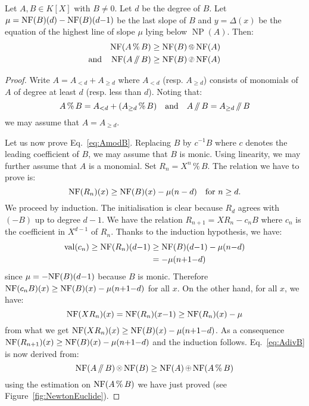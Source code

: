 \documentclass{sig-alternate-2013}
\DeclareMathOperator{\NP}{NP}
\DeclareMathOperator{\val}{val}
\newcommand{\NF}{\text{\rm NF}}
\renewcommand{\mod}{\,\%\,}
\renewcommand{\div}{\,/\hspace{-0.3em}/\,}
\newcommand{\nfop}[1]{%
\raisebox{-0.1mm}{\begin{tikzpicture}
\draw[transparent] (-0.18,0)--(0.18,0);
\draw[very thin] (0,0) circle (0.11cm);
\begin{scope}
\clip (0,0) circle (0.11cm);
\node[scale=0.75] at (0,0) { $#1$ };
\end{scope}
\end{tikzpicture}}}
\newcommand{\nfplus}{\nfop+}
\newcommand{\nftimes}{\nfop\times}
\newcommand{\nfmod}{\nfop\mod}
\newcommand{\nfdiv}{\nfop\div}
\begin{document}
\begin{theo}
\label{theo:EDivisionNP}
Let $A, B \in K[X]$ with $B \neq 0$. Let $d$ be the degree of $B$.
Let $\mu = \NF(B)(d) - \NF(B)(d{-}1)$ be the last slope of $B$ and 
$y = \Delta(x)$ be the
equation of the highest line of slope $\mu$ lying below $\NP(A)$.
Then:
\begin{align}
\NF(A \mod B) & \geq \NF(B) \nfmod \NF(A) \label{eq:AmodB} \\
\text{and} \hspace{4mm}
\NF(A \div B) & \geq \NF(B) \nfdiv \NF(A) \label{eq:AdivB}
\end{align}
\end{theo}

\begin{proof}
Write $A = A_{<d} + A_{\geq d}$ where $A_{<d}$ (resp. $A_{\geq d}$)
consists of monomials of $A$ of degree at least $d$ (resp. less than
$d$). Noting that:
$$A \mod B = A_{<d} + (A_{\geq d} \mod B)
\quad \text{and} \quad
A \div B = A_{\geq d} \div B$$
we may assume that $A = A_{\geq d}$.

Let us now prove Eq.~\eqref{eq:AmodB}. 
Replacing $B$ by $c^{-1} B$ where $c$ denotes the leading coefficient
of $B$, we may assume that $B$ is monic. Using linearity, we may further
assume that $A$ is a monomial. Set $R_n = X^n \mod B$. The relation
we have to prove is:
$$\NF(R_n)(x) \geq \NF(B)(x) - \mu(n-d)
\quad \text{for } n\geq d.$$
We proceed by induction. The initialisation is clear because $R_d$
agrees with $(-B)$ up to degree $d{-}1$. We have the relation
$R_{n+1} = X R_n - c_n B$
where $c_n$ is the coefficient in $X^{d-1}$ of $R_n$. Thanks to the
induction hypothesis, we have:
\begin{align*}
\val(c_n) \geq \NF(R_n)(d{-}1) & \geq \NF(B)(d{-}1) - \mu(n{-}d) \\
& = - \mu(n{+}1{-}d)
\end{align*}
since $\mu = -\NF(B)(d{-}1)$ because $B$ is monic. Therefore
$\NF(c_n B)(x) \geq \NF(B)(x) - \mu(n{+}1{-}d)$ for all $x$. On the 
other hand, for all $x$, we have:
$$\NF(X R_n)(x) = \NF(R_n)(x{-}1) \geq \NF(R_n)(x) - \mu$$
from what we get $\NF(X R_n)(x) \geq \NF(B)(x) - \mu(n{+}1{-}d)$. As a
consequence
$\NF(R_{n+1})(x) \geq \NF(B)(x) - \mu(n{+}1{-}d)$
and the induction follows.
Eq.~\eqref{eq:AdivB} is now derived from:
$$\NF(A \div B) \nftimes \NF(B) \geq \NF(A) \nfplus \NF(A \mod B)$$
using the estimation on $\NF(A\mod B)$ we have just proved
(see Figure~\ref{fig:NewtonEuclide}).
\end{proof}
\end{document}
